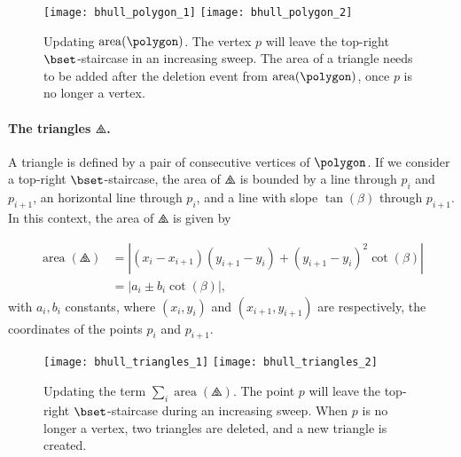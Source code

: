 \documentclass[11pt,letterpaper,english]{article}
\theoremstyle{definition}
\newcommand{\area}{\operatorname{area}}
\begin{document}
\begin{figure}[ht]
  \centering
  \subcaptionbox{\label{apps:area:fig:polygon:1}}
  {\texttt{[image: bhull\_polygon\_1]}}
  \hspace{1.5cm}
  \subcaptionbox{\label{apps:area:fig:polygon:2}}
  {\texttt{[image: bhull\_polygon\_2]}}
  \caption{Updating
    $\area(\polygon)$.  The vertex $p$
    will leave the top-right $\bset$-staircase in an increasing sweep.
     The area of a triangle needs to
    be added after the deletion event from $\area(\polygon)$, once $p$ is no longer a
    vertex.}
  \label{apps:area:fig:polygon}
\end{figure}

\paragraph{The triangles $\triangles$.}

A triangle is defined by a pair of consecutive vertices of $\polygon$. If we
consider a top-right $\bset$-staircase, the area of $\triangles$ is
bounded by a line through $p_i$ and $p_{i+1}$, an horizontal line
through $p_i$, and a line with slope $\tan(\beta)$ through
$p_{i+1}$. In this context, the area of $\triangles$ is given by

\begin{align}
  \label{apps:area:eqn:triangle_area}
  \area(\triangles) &= \left| (x_i-x_{i+1})(y_{i+1}-y_i)+(y_{i+1}-y_i)^2\cot(\beta) \right| \nonumber \\
                    &= \left| a_i \pm b_i \cot(\beta) \right|,
\end{align}
with $a_i, b_i$ constants, where $\left( x_i,y_i \right)$ and $\left( x_{i+1},y_{i+1} \right)$
are respectively, the coordinates of the points $p_i$ and $p_{i+1}$.

\begin{figure}[ht]
  \centering
  \subcaptionbox{\label{apps:area:fig:triangle:1}}
  {\texttt{[image: bhull\_triangles\_1]}}
  \hspace{1cm}
  \subcaptionbox{\label{apps:area:fig:triangle:2}}
  {\texttt{[image: bhull\_triangles\_2]}}
  \caption{Updating the term $\sum_i \area(\triangles)$.
     The point $p$ will leave the
    top-right $\bset$-staircase during an increasing
    sweep.  When $p$ is no longer a
    vertex, two triangles are deleted, and a new triangle is created.}
  \label{apps:area:fig:triangle}
\end{figure}
\end{document}
